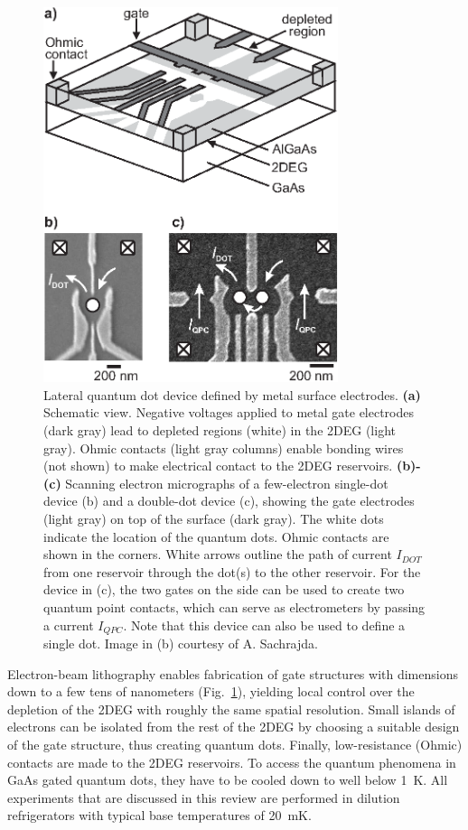 \documentclass[rmp,twocolumn,aps]{revtex4}
\begin{document}
\begin{figure}[htb]
\includegraphics[width=3.4in, clip=true]{hanson_fig02.eps}
\caption{Lateral quantum dot device defined by metal surface
electrodes. \textbf{(a)} Schematic view. Negative voltages applied
to metal gate electrodes (dark gray) lead to depleted regions
(white) in the 2DEG (light gray). Ohmic contacts (light gray
columns) enable bonding wires (not shown) to make electrical
contact to the 2DEG reservoirs. \textbf{(b)-(c)} Scanning electron
micrographs of a few-electron single-dot device (b) and a
double-dot device (c), showing the gate electrodes (light gray) on
top of the surface (dark gray). The white dots indicate the
location of the quantum dots. Ohmic contacts are shown in the
corners. White arrows outline the path of current $I_{DOT}$ from
one reservoir through the dot(s) to the other reservoir. For the
device in (c), the two gates on the side can be used to create two
quantum point contacts, which can serve as electrometers by
passing a current $I_{QPC}$. Note that this device can also be
used to define a single dot. Image in (b) courtesy of A.
Sachrajda.} \label{fig:structure}
\end{figure}

Electron-beam lithography enables fabrication of gate structures
with dimensions down to a few tens of nanometers
(Fig.~\ref{fig:structure}), yielding local control over the
depletion of the 2DEG with roughly the same spatial resolution.
Small islands of electrons can be isolated from the rest of the
2DEG by choosing a suitable design of the gate structure, thus
creating quantum dots. Finally, low-resistance (Ohmic) contacts
are made to the 2DEG reservoirs. To access the quantum phenomena
in GaAs gated quantum dots, they have to be cooled down to well
below 1~K. All experiments that are discussed in this review are
performed in dilution refrigerators with typical base temperatures
of 20~mK.
\end{document}
